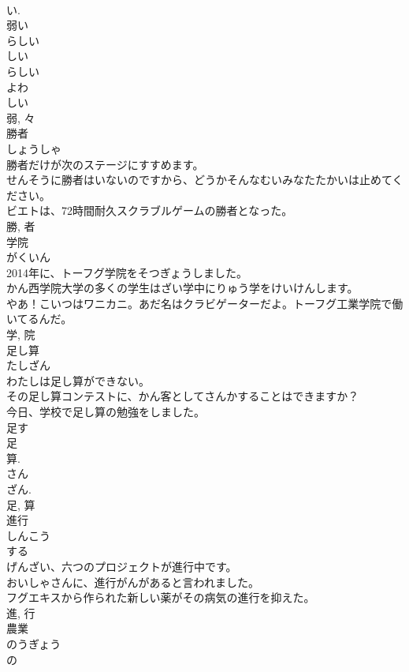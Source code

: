 \documentclass[8pt]{extreport}
\begin{document}
\begin{CJK}{UTF8}{min}
\\	い. 
\\	弱い 
\\	らしい 
\\	しい 
\\	らしい 
\\	よわ 
\\	しい 
\\	弱, 々	
\\	勝者	
\\	しょうしゃ	
\\	勝者だけが次のステージにすすめます。	
\\	せんそうに勝者はいないのですから、どうかそんなむいみなたたかいは止めてください。	
\\	ビエトは、72時間耐久スクラブルゲームの勝者となった。	
\\	勝, 者	
\\	学院	
\\	がくいん	
\\	2014年に、トーフグ学院をそつぎょうしました。	
\\	かん西学院大学の多くの学生はざい学中にりゅう学をけいけんします。	
\\	やあ！こいつはワニカニ。あだ名はクラビゲーターだよ。トーフグ工業学院で働いてるんだ。	
\\	学, 院	
\\	足し算	
\\	たしざん	
\\	わたしは足し算ができない。	
\\	その足し算コンテストに、かん客としてさんかすることはできますか？	
\\	今日、学校で足し算の勉強をしました。	
\\	足す 
\\	足 
\\	算. 
\\	さん 
\\	ざん. 
\\	足, 算	
\\	進行	
\\	しんこう	
\\	する 
\\	げんざい、六つのプロジェクトが進行中です。	
\\	おいしゃさんに、進行がんがあると言われました。	
\\	フグエキスから作られた新しい薬がその病気の進行を抑えた。	
\\	進, 行	
\\	農業	
\\	のうぎょう	
\\	の 

\end{CJK}
\end{document}
